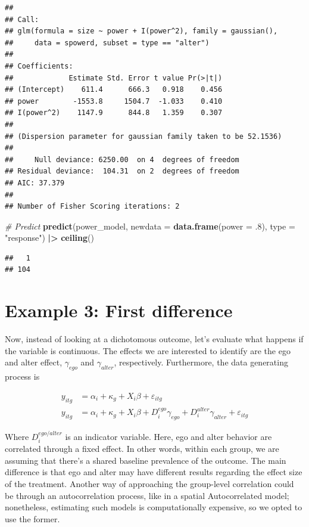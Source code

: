\documentclass[
]{book}
\newenvironment{Shaded}{\begin{snugshade}}{\end{snugshade}}
\newcommand{\AttributeTok}[1]{\textcolor[rgb]{0.13,0.29,0.53}{#1}}
\newcommand{\CommentTok}[1]{\textcolor[rgb]{0.56,0.35,0.01}{\textit{#1}}}
\newcommand{\DecValTok}[1]{\textcolor[rgb]{0.00,0.00,0.81}{#1}}
\newcommand{\FunctionTok}[1]{\textcolor[rgb]{0.13,0.29,0.53}{\textbf{#1}}}
\newcommand{\NormalTok}[1]{#1}
\newcommand{\SpecialCharTok}[1]{\textcolor[rgb]{0.81,0.36,0.00}{\textbf{#1}}}
\newcommand{\StringTok}[1]{\textcolor[rgb]{0.31,0.60,0.02}{#1}}
\begin{document}
\begin{verbatim}
## 
## Call:
## glm(formula = size ~ power + I(power^2), family = gaussian(), 
##     data = spowerd, subset = type == "alter")
## 
## Coefficients:
##             Estimate Std. Error t value Pr(>|t|)
## (Intercept)    611.4      666.3   0.918    0.456
## power        -1553.8     1504.7  -1.033    0.410
## I(power^2)    1147.9      844.8   1.359    0.307
## 
## (Dispersion parameter for gaussian family taken to be 52.1536)
## 
##     Null deviance: 6250.00  on 4  degrees of freedom
## Residual deviance:  104.31  on 2  degrees of freedom
## AIC: 37.379
## 
## Number of Fisher Scoring iterations: 2
\end{verbatim}

\begin{Shaded}
\begin{Highlighting}[]
\CommentTok{\# Predict}
\FunctionTok{predict}\NormalTok{(power\_model, }\AttributeTok{newdata =} \FunctionTok{data.frame}\NormalTok{(}\AttributeTok{power =}\NormalTok{ .}\DecValTok{8}\NormalTok{), }\AttributeTok{type =} \StringTok{"response"}\NormalTok{) }\SpecialCharTok{|\textgreater{}}
  \FunctionTok{ceiling}\NormalTok{()}
\end{Highlighting}
\end{Shaded}

\begin{verbatim}
##   1 
## 104
\end{verbatim}

\hypertarget{example-3-first-difference}{%
\section{Example 3: First difference}\label{example-3-first-difference}}

Now, instead of looking at a dichotomous outcome, let's evaluate what happens if
the variable is continuous. The effects we are interested to identify are the ego and alter effect, \(\gamma_{ego}\) and \(\gamma_{alter}\), respectively. Furthermore, the data generating process is

\begin{align*}
y_{itg} & = \alpha_i + \kappa_g + X_i\beta + \varepsilon_{itg} \\
y_{itg} & = \alpha_i + \kappa_g + X_i\beta + D_{i}^{ego}\gamma_{ego} + D_i^{alter}\gamma_{alter} + \varepsilon_{itg}
\end{align*}

Where \(D_i^{ego/alter}\) is an indicator variable. Here, ego and alter behavior are correlated through a fixed effect. In other words,
within each group, we are assuming that there's a shared baseline prevalence of
the outcome. The main difference is that ego and alter may have different results
regarding the effect size of the treatment. Another way of approaching the group-level
correlation could be through an autocorrelation process, like in a spatial Autocorrelated
model; nonetheless, estimating such models is computationally expensive, so we
opted to use the former.
\end{document}
